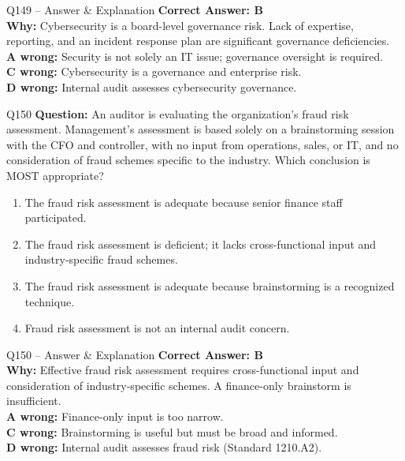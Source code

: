 \documentclass[aspectratio=169,10pt]{beamer}
\begin{document}
	\begin{frame}[t]{Q149 -- Answer \& Explanation}
		\small
		\textbf{Correct Answer: B} \\[4pt]
		\textbf{Why:} Cybersecurity is a board-level governance risk. Lack of expertise, reporting, and an incident response plan are significant governance deficiencies. \\[4pt]
		\textbf{A wrong:} Security is not solely an IT issue; governance oversight is required. \\[2pt]
		\textbf{C wrong:} Cybersecurity is a governance and enterprise risk. \\[2pt]
		\textbf{D wrong:} Internal audit assesses cybersecurity governance.
	\end{frame}
	
	\begin{frame}[t]{Q150}
		\small
		\textbf{Question:} An auditor is evaluating the organization's fraud risk assessment. Management's assessment is based solely on a brainstorming session with the CFO and controller, with no input from operations, sales, or IT, and no consideration of fraud schemes specific to the industry. Which conclusion is MOST appropriate?
		\begin{enumerate}[label=\Alph*.,itemsep=1pt,topsep=2pt]
			\item The fraud risk assessment is adequate because senior finance staff participated.
			\item The fraud risk assessment is deficient; it lacks cross-functional input and industry-specific fraud schemes.
			\item The fraud risk assessment is adequate because brainstorming is a recognized technique.
			\item Fraud risk assessment is not an internal audit concern.
		\end{enumerate}
	\end{frame}
	
	\begin{frame}[t]{Q150 -- Answer \& Explanation}
		\small
		\textbf{Correct Answer: B} \\[4pt]
		\textbf{Why:} Effective fraud risk assessment requires cross-functional input and consideration of industry-specific schemes. A finance-only brainstorm is insufficient. \\[4pt]
		\textbf{A wrong:} Finance-only input is too narrow. \\[2pt]
		\textbf{C wrong:} Brainstorming is useful but must be broad and informed. \\[2pt]
		\textbf{D wrong:} Internal audit assesses fraud risk (Standard 1210.A2).
	\end{frame}
	
\end{document}
